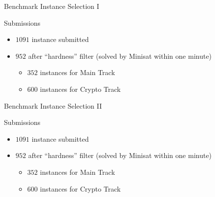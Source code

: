 \documentclass[trans]{beamer}
\begin{document}
\begin{frame}{Benchmark Instance Selection I}

\begin{block}{Submissions}
\begin{itemize}
\item $1091$ instance submitted
\item $952$ after ``hardness'' filter (solved by Minisat within one minute)
	\begin{itemize}
	\item $352$ instances for Main Track
	\item $600$ instances for Crypto Track
	\end{itemize}
\end{itemize}
\end{block}

\end{frame}

\begin{frame}{Benchmark Instance Selection II}

\begin{block}{Submissions}
\begin{itemize}
\item $1091$ instance submitted
\item $952$ after ``hardness'' filter (solved by Minisat within one minute)
	\begin{itemize}
	\item $352$ instances for Main Track
	\item $600$ instances for Crypto Track
	\end{itemize}
\end{itemize}
\end{block}

\end{frame}
\end{document}
